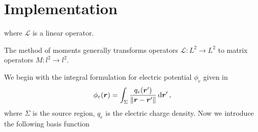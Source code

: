 \section{Implementation}

where $\mathcal{L}$ is a linear operator.

The method of moments generally transforms operators $\mathcal{L}: L^2 \to L^2$ to matrix operators $M: l^2 \to l^2$.  

We begin with the integral formulation for electric potential $\phi_e$ given in~\cite{zangwill2013modern}
\begin{equation}
    \phi_e(\vb*{r}) = \int_{\Sigma} \frac{q_e(\vb*{r}')}{\|\vb*{r} - \vb*{r}'\|}\dd{\vb*{r}'},
\end{equation}
where $\Sigma$ is the source region, $q_e$ is the electric charge density. Now we introduce the following basis function
